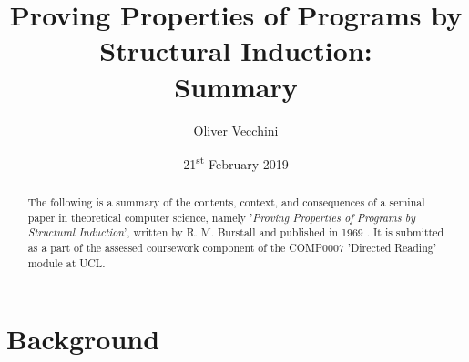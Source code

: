 \documentclass[11pt]{article}
\begin{document}
\title{Proving Properties of Programs by Structural Induction: \\Summary} 
\author{Oliver Vecchini} 
\date{21\textsuperscript{st} February 2019}

\maketitle


\begin{abstract}

        The following is a summary of the contents, context, and consequences of
        a seminal paper in theoretical computer science, namely '\textit{Proving
        Properties of Programs by Structural Induction}', written by R. M.
        Burstall and published in 1969 \cite{burstall1969proving}. It is
        submitted as a part of the assessed coursework component of the COMP0007
        'Directed Reading' module at UCL.

\end{abstract}


\section{Background}
\end{document}

